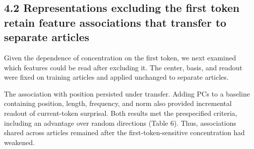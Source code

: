 \FloatBarrier

\subsection{4.2 Representations excluding the first token retain feature associations that transfer to separate articles}\label{representations-excluding-the-first-token-retain-feature-associations-that-transfer-to-separate-articles}

Given the dependence of concentration on the first token, we next examined which features could be read after excluding it. The center, basis, and readout were fixed on training articles and applied unchanged to separate articles.

The association with position persisted under transfer. Adding PCs to a baseline containing position, length, frequency, and norm also provided incremental readout of current-token surprisal. Both results met the prespecified criteria, including an advantage over random directions (Table 6). Thus, associations shared across articles remained after the first-token-sensitive concentration had weakened.


